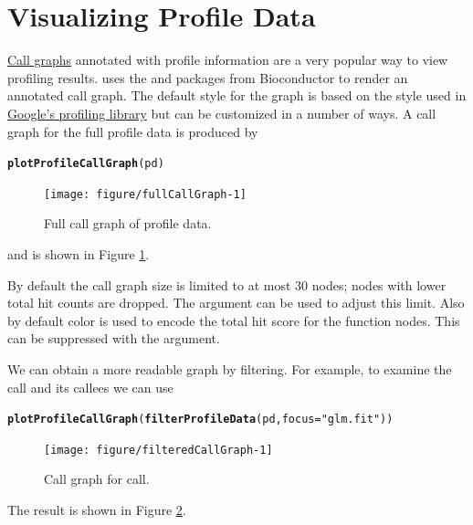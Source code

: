 \documentclass[nojss]{jss}\usepackage[]{graphicx}\usepackage[]{color}
\makeatletter
\newcommand{\hlstr}[1]{\textcolor[rgb]{0.192,0.494,0.8}{#1}}%
\newcommand{\hlstd}[1]{\textcolor[rgb]{0.345,0.345,0.345}{#1}}%
\newcommand{\hlkwc}[1]{\textcolor[rgb]{0.333,0.667,0.333}{#1}}%
\newcommand{\hlkwd}[1]{\textcolor[rgb]{0.737,0.353,0.396}{\textbf{#1}}}%
\newenvironment{kframe}{%
 \def\at@end@of@kframe{}%
 \ifinner\ifhmode%
  \def\at@end@of@kframe{\end{minipage}}%
  \begin{minipage}{\columnwidth}%
 \fi\fi%
 \def\FrameCommand##1{\hskip\@totalleftmargin \hskip-\fboxsep
 \colorbox{shadecolor}{##1}\hskip-\fboxsep
     \hskip-\linewidth \hskip-\@totalleftmargin \hskip\columnwidth}%
 \MakeFramed {\advance\hsize-\width
   \@totalleftmargin\z@ \linewidth\hsize
   \@setminipage}}%
 {\par\unskip\endMakeFramed%
 \at@end@of@kframe}
\newenvironment{knitrout}{}{} %
\makeatother
\begin{document}
\section{Visualizing Profile Data}
\href{https://en.wikipedia.org/wiki/Call_graph}{Call graphs} annotated
with profile information are a very popular way to view profiling
results.   uses the 
\citep{Gentleman:graph} and  \citep{Gentry:Rgraphviz}
packages from Bioconductor to render an annotated call graph. The
default style for the graph is based on the style used in
\href{https://github.com/gperftools}{Google's profiling library} but
can be customized in a number of ways.  A call graph for the full
profile data is produced by
\begin{knitrout}\small
{}\color{fgcolor}\begin{kframe}
\begin{alltt}
\hlkwd{plotProfileCallGraph}\hlstd{(pd)}
\end{alltt}
\end{kframe}\begin{figure}

{\centering \texttt{[image: figure/fullCallGraph-1]} 

}

\caption[Full call graph of profile data]{Full call graph of profile data.}\label{fig:fullCallGraph}
\end{figure}


\end{knitrout}
and is shown in Figure \ref{fig:fullCallGraph}.

By default the call graph size is limited to at most 30 nodes; nodes
with lower total hit counts are dropped. The  argument
can be used to adjust this limit. Also by default color is used to
encode the total hit score for the function nodes. This can be
suppressed with the  argument.

We can obtain a more readable graph by filtering. For example, to
examine the  call and its callees we can use
\begin{knitrout}\small
{}\color{fgcolor}\begin{kframe}
\begin{alltt}
\hlkwd{plotProfileCallGraph}\hlstd{(}\hlkwd{filterProfileData}\hlstd{(pd,} \hlkwc{focus} \hlstd{=} \hlstr{"glm.fit"}\hlstd{))}
\end{alltt}
\end{kframe}\begin{figure}

{\centering \texttt{[image: figure/filteredCallGraph-1]} 

}

\caption{Call graph for  call.}\label{fig:filteredCallGraph}
\end{figure}


\end{knitrout}
The result is shown in Figure \ref{fig:filteredCallGraph}.
\end{document}
